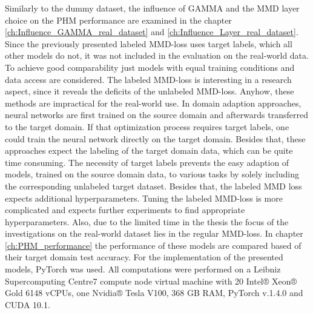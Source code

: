 Similarly to the dummy dataset, the influence of GAMMA and the MMD layer choice on the PHM performance are examined in the chapter \ref{ch:Influence_GAMMA_real_dataset} and \ref{ch:Influence_Layer_real_dataset}. Since the previously presented labeled MMD-loss uses target labels, which all other models do not, it was not included in the evaluation on the real-world data. To achieve good comparability just models with equal training conditions and data access are considered. The labeled MMD-loss is interesting in a research aspect, since it reveals the deficits of the unlabeled MMD-loss. Anyhow, these methods are impractical for the real-world use. In domain adaption approaches, neural networks are first trained on the source domain and afterwards transferred to the target domain. If that optimization process requires target labels, one could train the neural network directly on the target domain. Besides that, these approaches expect the labeling of the target domain data, which can be quite time consuming. The necessity of target labels prevents the easy adaption of models, trained on the source domain data, to various tasks by solely including the corresponding unlabeled target dataset. Besides that, the labeled MMD loss expects additional hyperparameters. Tuning the labeled MMD-loss is more complicated and expects further experiments to find appropriate hyperparameters. Also, due to the limited time in the thesis the focus of the investigations on the real-world dataset lies in the regular MMD-loss. In chapter \ref{ch:PHM_performance} the performance of these models are compared based of their target domain test accuracy. For the implementation of the presented models, PyTorch was used. All computations were performed on a Leibniz Supercomputing Centre7 compute node virtual machine with 20
Intel® Xeon® Gold 6148 vCPUs, one Nvidia® Tesla V100, 368 GB RAM, PyTorch v.1.4.0 and CUDA 10.1.


